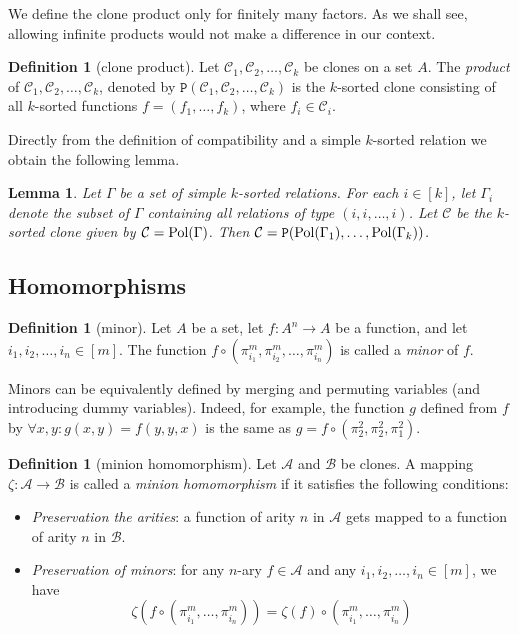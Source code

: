 \documentclass{amsart}
\numberwithin{equation}{section}
\theoremstyle{plain}
\newtheorem{lemma}[theorem]{Lemma}
\theoremstyle{definition}
\newtheorem{definition}[theorem]{Definition}
\def\set#1{#1}
\def\clone#1{\mathcal{#1}}
\def\C#1{{\mathtt{P}}(#1)}
\def\Pol{{\rm Pol}}
\begin{document}
We define the clone product only for finitely many factors. As we shall see, allowing infinite products would not make a difference in our context.

\begin{definition}[clone product]
Let $\clone{C}_1,\clone{C}_2,\dots,\clone{C}_k$ be clones on a set $\set{A}$. The {\em product} of $\clone{C}_1,\clone{C}_2,\dots,\clone{C}_k$, denoted by $\C{\clone{C}_1,\clone{C}_2,\dots,\clone{C}_k}$ is the $k$-sorted clone consisting of all $k$-sorted functions $f = (f_1,\dots,f_k)$, where $f_i\in \clone{C}_i$.
\end{definition}

Directly from the definition of compatibility and a simple $k$-sorted relation we obtain the following lemma. 

\begin{lemma}
  \label{all-clones-are-products}
  Let $\Gamma$ be a set of simple $k$-sorted relations. For each $i\in[k]$, let $\Gamma_i$ denote the subset of $\Gamma$ containing all relations of type $(i,i,\dots,i)$. Let $\clone{C}$ be the $k$-sorted clone given by $\clone{C}=\Pol(\Gamma)$. Then $\clone{C}=\C{\Pol({\Gamma}_1),\dots,\Pol({\Gamma}_k)}$.
\end{lemma}

\subsection{Homomorphisms}

\begin{definition}[minor]
Let $\set{A}$ be a set, let $f\colon \set{A}^n\to \set{A}$ be a function, and let $i_1,i_2,\dots,i_n\in [m]$. The function $f\circ (\pi_{i_1}^m,\pi_{i_2}^m,\dots,\pi_{i_n}^m)$ is called a {\em minor} of $f$.
\end{definition}

Minors can be equivalently defined by merging and permuting variables (and introducing dummy variables). Indeed, for example, the function $g$ defined from $f$ by $\forall x,y: g(x,y) = f(y,y,x)$ is the same as $g = f \circ (\pi_2^2,\pi_2^2,\pi_1^2)$.

\begin{definition}[minion homomorphism]
Let $\clone{A}$ and $\clone{B}$ be clones. A mapping $\zeta\colon\clone{A}\to \clone{B}$ is called a {\em minion homomorphism} if it satisfies the following conditions:
\begin{itemize}
\item {\em Preservation the arities}: 
a function of arity $n$ in $\clone{A}$ gets mapped to a function of arity $n$ in $\clone{B}$.  
\item {\em Preservation of minors}: for any $n$-ary $f\in \clone{A}$  and any $i_1,i_2,\dots,i_n\in [m]$, we have 
$$\zeta(f\circ(\pi_{i_1}^m,\dots,\pi_{i_n}^m)) = \zeta(f)\circ(\pi_{i_1}^m,\dots,\pi_{i_n}^m) $$
\end{itemize}
\end{definition}
\end{document}
